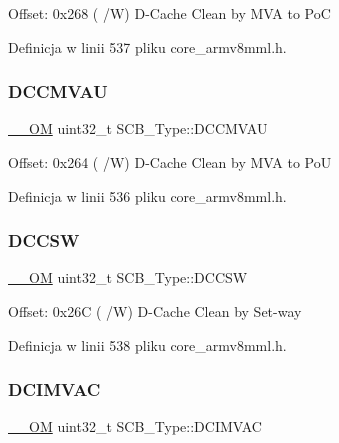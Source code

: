 Offset\+: 0x268 ( /W) D-\/\+Cache Clean by M\+VA to PoC 

Definicja w linii 537 pliku core\+\_\+armv8mml.\+h.

\mbox{\label{struct_s_c_b___type_aae3caeea159ab54859ea11397f942cfa}} 
\subsubsection{\texorpdfstring{D\+C\+C\+M\+V\+AU}{DCCMVAU}}
{\footnotesize\ttfamily \hyperlink{core__sc300_8h_a0ea2009ed8fd9ef35b48708280fdb758}{\+\_\+\+\_\+\+OM} uint32\+\_\+t S\+C\+B\+\_\+\+Type\+::\+D\+C\+C\+M\+V\+AU}

Offset\+: 0x264 ( /W) D-\/\+Cache Clean by M\+VA to PoU 

Definicja w linii 536 pliku core\+\_\+armv8mml.\+h.

\mbox{\label{struct_s_c_b___type_ab95cc818be9fa7d25ae516f3fe6b7788}} 
\subsubsection{\texorpdfstring{D\+C\+C\+SW}{DCCSW}}
{\footnotesize\ttfamily \hyperlink{core__sc300_8h_a0ea2009ed8fd9ef35b48708280fdb758}{\+\_\+\+\_\+\+OM} uint32\+\_\+t S\+C\+B\+\_\+\+Type\+::\+D\+C\+C\+SW}

Offset\+: 0x26C ( /W) D-\/\+Cache Clean by Set-\/way 

Definicja w linii 538 pliku core\+\_\+armv8mml.\+h.

\mbox{\label{struct_s_c_b___type_a4be79491ab1ed14f3b0237ba7e69063c}} 
\subsubsection{\texorpdfstring{D\+C\+I\+M\+V\+AC}{DCIMVAC}}
{\footnotesize\ttfamily \hyperlink{core__sc300_8h_a0ea2009ed8fd9ef35b48708280fdb758}{\+\_\+\+\_\+\+OM} uint32\+\_\+t S\+C\+B\+\_\+\+Type\+::\+D\+C\+I\+M\+V\+AC}

